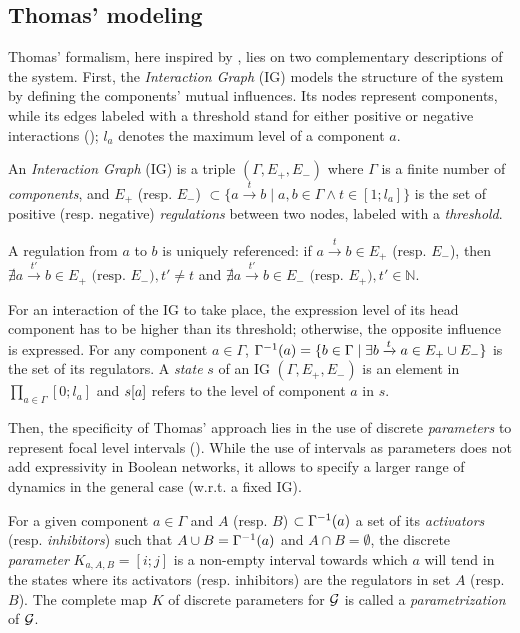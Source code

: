 \subsection{Thomas' modeling}
Thomas' formalism, here inspired by \cite{Richard06,BernotSemBRN}, lies on two complementary descriptions of the system.
First, the \emph{Interaction Graph} (IG) models the structure of the system by defining the components' mutual influences.
Its nodes represent components, while its edges labeled with a threshold stand for either positive or negative interactions ();
$l_a$ denotes the maximum level of a component $a$.

\begin{definition}
\label{def:ig}
An \emph{Interaction Graph} (IG) is a triple $(\Gamma, E_+, E_-)$ where $\Gamma$ is a finite number of \emph{components},
and $E_+$ (resp. $E_-$) $\subset \{a \xrightarrow{t} b \mid a, b \in \Gamma \wedge t \in [1; l_a]\}$
is the set of positive (resp. negative) \emph{regulations} between two nodes, labeled with a \emph{threshold}.

A regulation from $a$ to $b$ is uniquely referenced:
if $a \xrightarrow{t} b \in E_+$ (resp. $E_-$),
then $\nexists a \xrightarrow{t'} b \in E_+ \text{ (resp. $E_-$)}, t' \neq t$
and $\nexists a \xrightarrow{t'} b \in E_-\text{ (resp. $E_+$)}, t' \in \mathbb{N}$.
\end{definition}

\noindent
For an interaction of the IG to take place, the expression level of its head component has to be higher than its threshold; otherwise, the opposite influence is expressed.
For any component $a \in \Gamma$, $\Gamma^{-1}(a) = \{ b\in\Gamma\mid \exists b\xrightarrow t a\in E_+\cup E_- \}$
is the set of its regulators.
A \emph{state} $s$ of an IG $(\Gamma, E_+, E_-)$ is an element in $\prod_{a \in \Gamma} [0;l_a]$
and ${s[a]}$ refers to the level of component $a$ in $s$.

Then, the specificity of Thomas' approach lies in the use of discrete \emph{parameters} to represent focal level intervals ().
While the use of intervals as parameters does not add expressivity in Boolean networks, it allows to specify a larger range of dynamics in the general case (w.r.t. a fixed IG).

\begin{definition}\label{def:param}
For a given component $a \in \Gamma$ and $A$ (resp. $B$) $\subset \Gamma^{-1}(a)$ a set of its \emph{activators} (resp. \emph{inhibitors}) such that $A \cup B = \Gamma^{-1}(a)$ and $A \cap B = \emptyset$,
the discrete \emph{parameter} $K_{a,A,B} = [i; j]$ is a non-empty interval towards which $a$ will tend
in the states where its activators (resp. inhibitors) are the regulators in set $A$ (resp. $B$).
The complete map $K$ of discrete parameters for $\mathcal{G}$ is called a \emph{parametrization} of $\mathcal{G}$.
\end{definition}

